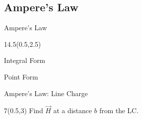 \begin{lesson28}
\section{Ampere's Law}
\begin{frame}{Ampere's Law}
\begin{textblock}{14.5}(0.5,2.5)
\begin{myblock}[0.95]{Integral Form}
\vspace{-6pt}

\vspace{-12pt}


\end{myblock}

\begin{myblock}[0.95]{Point Form}
\vspace{-6pt}

\vspace{-12pt}

\end{myblock}

\end{textblock}

\end{frame}


\begin{frame}{Ampere's Law: Line Charge}
\begin{textblock}{7}(0.5,3)
Find $\vec{H}$ at a distance $b$ from the LC.


\end{textblock}
\end{frame}
\end{lesson28}
